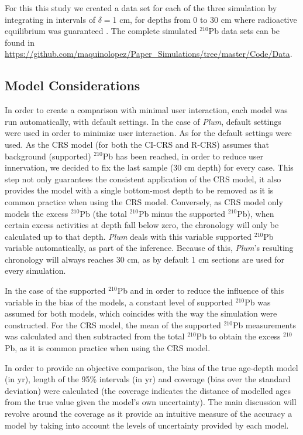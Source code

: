\documentclass [10pt] {article}
\begin{document}
For this this study we created a data set for each of the three simulation by integrating in intervals of $\delta =$1 cm, for depths from  0 to 30 cm where radioactive equilibrium was guaranteed \citep{Aquino2018}.
The complete simulated $^{210}$Pb data sets can be found in \url{https://github.com/maquinolopez/Paper_Simulations/tree/master/Code/Data}.

\subsection{Model Considerations}
In order to create a comparison with minimal user interaction, each model was run automatically, with default settings.
In the case of \textit{Plum}, default settings were used in order to minimize user interaction.
As for the default settings were used.
As the CRS model (for both the CI-CRS and R-CRS) assumes that background (supported) $^{210}$Pb has been reached, in order to reduce user innervation, we decided to fix the last sample (30 cm depth) for every case.
This step not only guarantees the consistent application of the CRS model, it also provides the model with a single bottom-most depth to be removed as it is common practice when using the CRS model.
Conversely, as CRS model only models the excess $^{210}$Pb (the total $^{210}$Pb minus the supported $^{210}$Pb), when certain excess activities at depth fall below zero, the chronology will only be calculated up to that depth.
\textit{Plum} deals with this variable supported $^{210}$Pb variable automatically, as part of the inference.
Because of this, \textit{Plum}'s resulting chronology will always reaches 30 cm, as by default 1 cm sections are used for every simulation.

In the case of the supported $^{210}$Pb and in order to reduce the influence of this variable in the bias of the models, a constant level of supported $^{210}$Pb was assumed for both models, which coincides with the way the simulation were constructed.
For the CRS model, the mean of the supported $^{210}$Pb measurements was calculated and then subtracted from the total $^{210}$Pb to obtain the excess $^{210}$Pb, as it is common practice when using the CRS model.

In order to provide an objective comparison, the bias of the true age-depth model (in yr), length of the 95\% intervals (in yr) and coverage (bias over the standard deviation) were calculated (the coverage indicates the distance of modelled ages from the true value given the model's own uncertainty). 
The main discussion will revolve around the coverage as it provide an intuitive measure of the accuracy a model by taking into account the levels of uncertainty provided by each model. 
\end{document}
